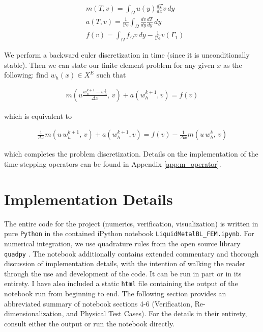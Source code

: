\documentclass[10pt]{article}
\newcommand{\Pe}{\text{Pe}}
\begin{document}
    \begin{align}
      &m(T,v)  = \int_\Omega u(y) \frac{dT}{dx} v\, dy \\
      &a(T, v) =\frac{1}{\Pe} \int_{\Omega}^{} \frac{dv}{dy} \frac{dT}{dy} \, dy \\
      &f(v)    = \int_{\Omega}^{} f_\Omega v\,dy -\frac{1}{\Pe} v(\Gamma_1)
    \end{align}

    We perform a backward euler discretization in time (since it is unconditionally stable). Then we
    can state our finite element problem for any given $x$ as the following: $\text{find } w_h(x)\in
    X^E \text{ such that }$

    \begin{align}
      m\left(u \frac{w_h^{k+1} - w_h^{k}}{\Delta x},\, v  \right) 
      + a\left(w_h^{k+1},v\right) = f(v)
    \end{align}

    which is equivalent to 

    \begin{align}
      \frac{1}{\Delta x} m\left(u \, w_h^{k+1},\, v  \right) 
      + a\left(w_h^{k+1},v\right) = f(v) - \frac{1}{\Delta x} m(u\, w_h^k,\, v)
    \end{align}

    which completes the problem discretization.  Details on the implementation of the time-stepping
    operators can be found in Appendix \ref{app:m_operator}.

\section{Implementation Details}

  The entire code for the project (numerics, verification, visualization) is written in pure
  \texttt{Python} in the contained iPython notebook \texttt{LiquidMetalBL\_FEM.ipynb}.  For numerical
  integration, we use quadrature rules from the open source library \texttt{quadpy} \cite{quadpy}.
  The notebook additionally contains extended commentary and thorough discussion of implementation
  details, with the intention of walking the reader through the use and development of the code. It
  can be run in part or in its entirety. I have also included a static \texttt{html} file containing
  the output of the notebook run from beginning to end. The following section provides an
  abbreviated summary of notebook sections 4-6 (Verification, Re-dimensionalization, and Physical
  Test Cases). For the details in their entirety, consult either the output or run the notebook
  directly. 
\end{document}
